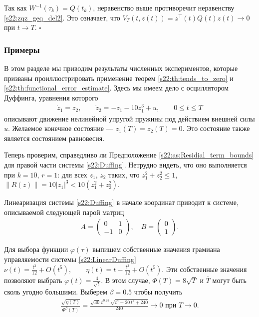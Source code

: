 \documentclass[../main.tex]{subfiles}
\begin{document}
 Так как $ W^{-1}(\tau_k) = Q(t_k)$, неравенство выше противоречит неравенству \eqref{s22:zqz_geq_del2}. 
 Это означает, что $V_{T}(t,z(t)) = z^{\top}(t)Q(t)z(t) \to 0$ при $t \to T$.
 \hfill $ \square $

\subsubsection{Примеры}
\label{s2:examples}

В этом разделе мы приводим результаты численных экспериментов, которые призваны проиллюстрировать применение теорем \ref{s22:th:tends_to_zero} и \ref{s22:th:functional_error_estimate}. 
Здесь мы имеем дело с осциллятором Дуффинга, уравнения которого
\begin{gather}\label{s22:Duffing}
 \dot{z}_1 = z_2, \qquad \dot{z}_2 = -z_1 - 10z_1^3 + u,\qquad 0\leqslant t 
 \leqslant T
\end{gather}
описывают движение нелинейной упругой пружины под действием внешней силы $u$. 
Желаемое конечное состояние --- $z_1(T) = z_2(T) = 0$. 
Это состояние также является состоянием равновесия. 

Теперь проверим, справедливо ли Предположение \ref{s22:as:Residial_term_bounds} для правой части системы \eqref{s22:Duffing}. 
Нетрудно видеть, что оно выполняется при $k = 10$, $r = 1$: для всех $z_1$, $z_2$ таких, что $z_1^2+z_2^2 \leqslant 1$, $\|R(z)\| = 10|z_1|^3 < 10 (z_1^2+z_2^2)$.

Линеаризация системы \eqref{s22:Duffing} в начале координат приводит к системе, описываемой следующей парой матриц
\begin{gather}\label{s22:LinearDuffing}
A = \begin{pmatrix} 0 & 1\\
 -1 & 0
 \end{pmatrix}, \quad B = \begin{pmatrix}
 0\\
 1
 \end{pmatrix}.
\end{gather}

Для выбора функции $\varphi(\tau)$ выпишем собственные значения грамиана управляемости системы \eqref{s22:LinearDuffing} $\nu(t) = \frac{t^3}{12} + O(t^5), \qquad \eta(t) = t - \frac{t^3}{12}+ O(t^5)$.
Эти собственные значения позволяют выбрать $\varphi(t) = \frac{4}{\sqrt{t}}$. 
В этом случае, $\Phi(T) = 8\sqrt{T}$ и $\overline{T}$ могут быть сколь угодно большими. 
Выберем $\beta = 0.5$ чтобы получить 
\begin{gather*}
 \frac{\sqrt{\eta(T)}}{\Phi^\beta(T)} = \frac{\sqrt{30}\,t^{0.25}\,\sqrt{t^4-20\,t^2+240}}{240} \to 0 \mbox{ при } T \to 0.
\end{gather*} 
\end{document}
